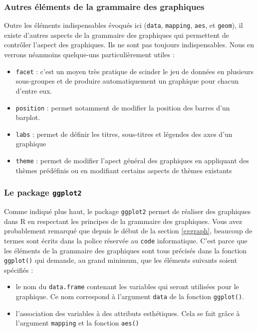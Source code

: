 \documentclass[a4paperpaper,]{article}
\providecommand{\tightlist}{%
  \setlength{\itemsep}{0pt}\setlength{\parskip}{0pt}}
\theoremstyle{definition}
\theoremstyle{definition}
\theoremstyle{definition}
\theoremstyle{remark}
\begin{document}
\hypertarget{autres-elements-de-la-grammaire-des-graphiques}{%
\subsubsection{Autres éléments de la grammaire des
graphiques}\label{autres-elements-de-la-grammaire-des-graphiques}}

Outre les éléments indispensables évoqués ici (\texttt{data},
\texttt{mapping}, \texttt{aes}, et \texttt{geom}), il existe d'autres
aspects de la grammaire des graphiques qui permettent de contrôler
l'aspect des graphiques. Ils ne sont pas toujours indispensables. Nous
en verrons néanmoins quelque-uns particulièrement utiles :

\begin{itemize}
\tightlist
\item
  \texttt{facet} : c'est un moyen très pratique de scinder le jeu de
  données en plusieurs sous-groupes et de produire automatiquement un
  graphique pour chacun d'entre eux.
\item
  \texttt{position} : permet notamment de modifier la position des
  barres d'un barplot.
\item
  \texttt{labs} : permet de définir les titres, sous-titres et légendes
  des axes d'un graphique
\item
  \texttt{theme} : permet de modifier l'apect général des graphiques en
  appliquant des thèmes prédéfinis ou en modifiant certains aspects de
  thèmes existants
\end{itemize}

\hypertarget{le-package-ggplot2}{%
\subsubsection{\texorpdfstring{Le package
\texttt{ggplot2}}{Le package ggplot2}}\label{le-package-ggplot2}}

Comme indiqué plus haut, le package \texttt{ggplot2} \citep{R-ggplot2}
permet de réaliser des graphiques dans R en respectant les principes de
la grammaire des graphiques. Vous avez probablement remarqué que depuis
le début de la section \ref{gggraph}, beaucoup de termes sont écrits
dans la police réservée au \texttt{code} informatique. C'est parce que
les éléments de la grammaire des graphiques sont tous précisés dans la
fonction \texttt{ggplot()} qui demande, au grand minimum, que les
éléments suivants soient spécifiés :

\begin{itemize}
\tightlist
\item
  le nom du \texttt{data.frame} contenant les variables qui seront
  utilisées pour le graphique. Ce nom correspond à l'argument
  \texttt{data} de la fonction \texttt{ggplot()}.
\item
  l'association des variables à des attributs esthétiques. Cela se fait
  grâce à l'argument \texttt{mapping} et la fonction \texttt{aes()}
\end{itemize}
\end{document}
